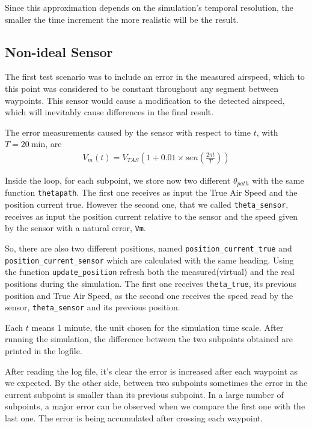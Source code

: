 \documentclass{article}
\begin{document}
Since this approximation depends on the simulation's temporal resolution, the smaller the time increment the more realistic will be the result.

\subsection{Non-ideal Sensor}

The first test scenario was to include an error in the measured airspeed, which to this point was considered to be constant throughout any segment between waypoints. This sensor would cause a modification to the detected airspeed, which will inevitably cause differences in the final result.

The error measurements caused by the sensor with respect to time $t$, with $T=\SI{20}{\minute}$, are
\begin{gather*}
    V_m(t) = V_{TAS}\left(1+0.01 \times sen\left(\frac{2\pi t}{T}\right)\right)
\end{gather*}

Inside the loop, for each subpoint, we store now two different $\theta_{path}$ with the same function \texttt{thetapath}. The first one receives as input the True Air Speed and the position current true. However the second one, that we called \texttt{theta_sensor}, receives as input the position current relative to the sensor and the speed given by the sensor with a natural error, \texttt{Vm}.
\par So, there are also two different positions, named \texttt{position_current_true} and \texttt{position_current_sensor} which are calculated with the same heading. Using the function \texttt{update_position} refresh both the measured(virtual) and the real positions during the simulation. The first one receives \texttt{theta_true}, its previous position and True Air Speed, as the second one receives the speed read by the sensor, \texttt{theta_sensor} and its previous position. 
\par Each $t$ means 1 minute, the unit chosen for the simulation time scale. After running the simulation, the difference between the two subpoints obtained are printed in the logfile.
\par After reading the log file, it's clear the error is increased after each waypoint as we expected. By the other side, between two subpoints sometimes the error in the current subpoint is smaller than its previous subpoint. In a large number of subpoints, a major error can be observed when we compare the first one with the last one. The error is being accumulated after crossing each waypoint.
\end{document}
